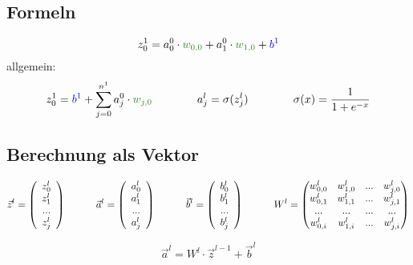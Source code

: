 \documentclass{article}
\begin{document}
\subsection{Formeln}
\[ z_0^1 = a_0^0 \cdot \textcolor{OliveGreen}{w_{0,0}} + a_1^0 \cdot \textcolor{OliveGreen}{w_{1,0}} + \textcolor{blue}{b^1} \]
allgemein:
\[  z_0^1 = \textcolor{blue}{b^1} + \sum_{j=0}^{n^1} a_j^0 \cdot \textcolor{OliveGreen}{w_{j,0}}  
\kern 40pt
a_j^l = \sigma(z_j^l) 
\kern 40pt
\sigma(x) = \frac{1}{1 + e^{-x}}\]


\pagebreak
\subsection{Berechnung als Vektor}
\[ \vec{z}^l = \left(\begin{array}{c} z_0^l \\ z_1^l \\ ... \\ z_j^l \end{array}\right) 
\kern 30pt
\vec{a}^l = \left(\begin{array}{c} a_0^l \\ a_1^l \\ ... \\ a_j^l \end{array}\right) 
\kern 30pt
\vec{b}^l = \left(\begin{array}{c} b_0^l \\ b_1^l \\ ... \\ b_j^l \end{array}\right) 
\kern 30pt
W^l = \begin{pmatrix}
    w_{0,0}^l & w_{1,0}^l & ... & w_{j,0}^l \\
    w_{0,1}^l & w_{1,1}^l & ... & w_{j,1}^l \\
    ... & ... & ... & ... \\
    w_{0,i}^l & w_{1,i}^l & ... & w_{j,i}^l
\end{pmatrix} \]

\[ \vec{a}^l = W^l \cdot \vec{z}^{l-1} + \vec{b}^l \]
\end{document}
